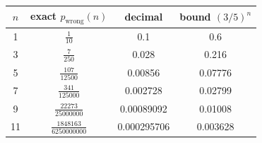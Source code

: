 \begin{tabular}{@{}c c c c@{}}
\toprule
$n$ & exact $p_{\mathrm{wrong}}(n)$ & decimal & bound $(3/5)^n$\\
\midrule
1 & $\tfrac{1}{10}$ & 0.1 & 0.6\\
3 & $\tfrac{7}{250}$ & 0.028 & 0.216\\
5 & $\tfrac{107}{12500}$ & 0.00856 & 0.07776\\
7 & $\tfrac{341}{125000}$ & 0.002728 & 0.02799\\
9 & $\tfrac{22273}{25000000}$ & 0.00089092 & 0.01008\\
11 & $\tfrac{1848163}{6250000000}$ & 0.000295706 & 0.003628\\
\bottomrule
\end{tabular}
